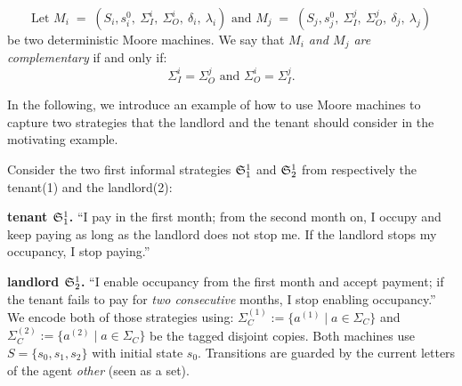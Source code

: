   \begin{definition}
  \[\text{Let } 
  M_i \;=\; (S_i, s^0_i,\ \Sigma_I^i,\ \Sigma_O^i,\ \delta_i,\ \lambda_i) \text{ and } M_j \;=\; (S_j, s^0_j,\ \Sigma_I^j,\ \Sigma_O^j,\ \delta_j,\ \lambda_j) 
  \]
  be two deterministic Moore machines. We say that \emph{$M_i$ and $M_j$ are complementary} if and only if:
  \[ \Sigma_I^i = \Sigma_O^j \text{ and } \Sigma_O^i = \Sigma_I^j.\]
  \end{definition}
  In the following, we introduce an example of how to use Moore machines to capture two strategies that the landlord and the tenant should consider in the motivating example.
  \begin{example}
  \label{ex:twomoore}
  Consider the two first informal strategies $\mathfrak{S}_1^1$ and $\mathfrak{S}_2^1$ from respectively the tenant(1) and the landlord(2):
  
  \medskip
  \noindent\textbf{tenant $\mathfrak{S}_1^1$.}
  “I pay in the first month; from the second month on, I occupy and keep paying as long as the landlord does not stop me. If the landlord stops my occupancy, I stop paying.”
  
  \noindent\textbf{landlord $\mathfrak{S}_2^1$.}
  “I enable occupancy from the first month and accept payment; if the tenant fails to pay for \emph{two consecutive} months, I stop enabling occupancy.”
  We encode both of those strategies using: $\Sigma_C^{(1)}:=\{a^{(1)}\mid a\in\Sigma_C\}$ and
  $\Sigma_C^{(2)}:=\{a^{(2)}\mid a\in\Sigma_C\}$ be the tagged disjoint copies.
  Both machines use $S=\{s_0,s_1,s_2\}$ with initial state $s_0$.
  Transitions are guarded by the current letters of the agent \emph{other} (seen as a set).


\end{example}
